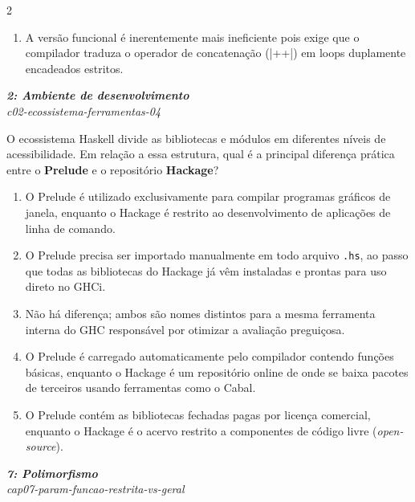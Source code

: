 \documentclass[a4paper,10pt,brazil]{article}
\begin{document}
\begin{multicols}{2}
\begin{enumerate}
  \item A versão funcional é inerentemente mais ineficiente pois exige que o compilador traduza o operador de concatenação (\haskellinline|++|) em loops duplamente encadeados estritos.


\end{enumerate}

\begin{flushright}
  \footnotesize
  \textit{\textbf{2: Ambiente de desenvolvimento}}\\
  \textit{c02-ecossistema-ferramentas-04}\\

\end{flushright}
O ecossistema Haskell divide as bibliotecas e módulos em diferentes níveis de acessibilidade. Em relação a essa estrutura, qual é a principal diferença prática entre o \textbf{Prelude} e o repositório \textbf{Hackage}?

\begin{enumerate}
  \item O Prelude é utilizado exclusivamente para compilar programas gráficos de janela, enquanto o Hackage é restrito ao desenvolvimento de aplicações de linha de comando.

  \item O Prelude precisa ser importado manualmente em todo arquivo \texttt{.hs}, ao passo que todas as bibliotecas do Hackage já vêm instaladas e prontas para uso direto no GHCi.

  \item Não há diferença; ambos são nomes distintos para a mesma ferramenta interna do GHC responsável por otimizar a avaliação preguiçosa.

  \item O Prelude é carregado automaticamente pelo compilador contendo funções básicas, enquanto o Hackage é um repositório online de onde se baixa pacotes de terceiros usando ferramentas como o Cabal.

  \item O Prelude contém as bibliotecas fechadas pagas por licença comercial, enquanto o Hackage é o acervo restrito a componentes de código livre (\emph{open-source}).


\end{enumerate}

\begin{flushright}
  \footnotesize
  \textit{\textbf{7: Polimorfismo}}\\
  \textit{cap07-param-funcao-restrita-vs-geral}\\


\end{flushright}
\end{multicols}
\end{document}
